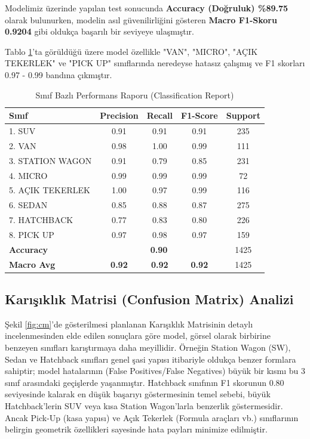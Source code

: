 \documentclass[conference]{IEEEtran}
\begin{document}
Modelimiz üzerinde yapılan test sonucunda \textbf{Accuracy (Doğruluk) \%89.75} olarak bulunurken, modelin asıl güvenilirliğini gösteren \textbf{Macro F1-Skoru 0.9204} gibi oldukça başarılı bir seviyeye ulaşmıştır.

Tablo \ref{tab:classification_report}'ta görüldüğü üzere model özellikle "VAN", "MICRO", "AÇIK TEKERLEK" ve "PICK UP" sınıflarında neredeyse hatasız çalışmış ve F1 skorları 0.97 - 0.99 bandına çıkmıştır.

\begin{table}[htbp]
\caption{Sınıf Bazlı Performans Raporu (Classification Report)}
\begin{center}
\begin{tabular}{lcccc}
\toprule
\textbf{Sınıf} & \textbf{Precision} & \textbf{Recall} & \textbf{F1-Score} & \textbf{Support}\\
\midrule
1. SUV           & 0.91 & 0.91 & 0.91 & 235 \\
2. VAN           & 0.98 & 1.00 & 0.99 & 111 \\
3. STATION WAGON & 0.91 & 0.79 & 0.85 & 231 \\
4. MICRO         & 0.99 & 0.99 & 0.99 & 72  \\
5. AÇIK TEKERLEK & 1.00 & 0.97 & 0.99 & 116 \\
6. SEDAN         & 0.85 & 0.88 & 0.87 & 275 \\
7. HATCHBACK     & 0.77 & 0.83 & 0.80 & 226 \\
8. PICK UP       & 0.97 & 0.98 & 0.97 & 159 \\
\midrule
\textbf{Accuracy}  & \multicolumn{3}{c}{\textbf{0.90}} & 1425 \\
\textbf{Macro Avg} & \textbf{0.92} & \textbf{0.92} & \textbf{0.92} & 1425 \\
\bottomrule
\end{tabular}
\label{tab:classification_report}
\end{center}
\end{table}

\subsection{Karışıklık Matrisi (Confusion Matrix) Analizi}

Şekil \ref{fig:cm}'de gösterilmesi planlanan Karışıklık Matrisinin detaylı incelenmesinden elde edilen sonuçlara göre model, görsel olarak birbirine benzeyen sınıfları karıştırmaya daha meyillidir. Örneğin Station Wagon (SW), Sedan ve Hatchback sınıfları genel şasi yapısı itibariyle oldukça benzer formlara sahiptir; model hatalarının (False Positives/False Negatives) büyük bir kısmı bu 3 sınıf arasındaki geçişlerde yaşanmıştır. Hatchback sınıfının F1 skorunun 0.80 seviyesinde kalarak en düşük başarıyı göstermesinin temel sebebi, büyük Hatchback'lerin SUV veya kısa Station Wagon'larla benzerlik göstermesidir. 
Ancak Pick-Up (kasa yapısı) ve Açık Tekerlek (Formula araçları vb.) sınıflarının belirgin geometrik özellikleri sayesinde hata payları minimize edilmiştir.
\end{document}
